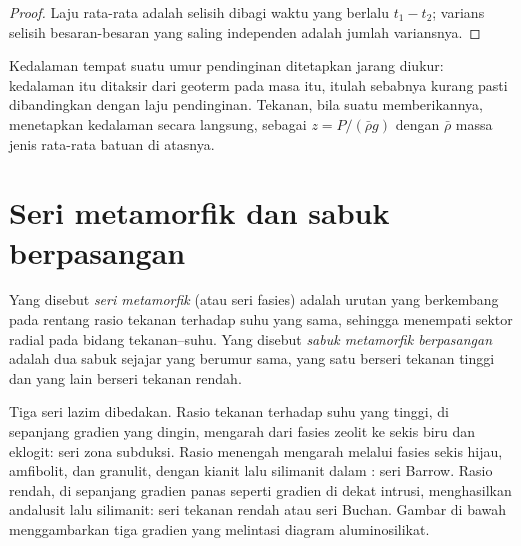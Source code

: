 \begin{proof}
Laju rata-rata adalah selisih dibagi waktu yang berlalu $t_1 - t_2$; varians
selisih besaran-besaran yang saling independen adalah jumlah variansnya.
\end{proof}

Kedalaman tempat suatu umur pendinginan ditetapkan jarang diukur: kedalaman itu ditaksir dari
geoterm pada masa itu, itulah sebabnya  kurang pasti dibandingkan dengan laju pendinginan.
Tekanan, bila suatu  memberikannya, menetapkan kedalaman secara langsung, sebagai
$z = P/(\bar\rho g)$ dengan $\bar\rho$ massa jenis rata-rata batuan di atasnya.

\section{Seri metamorfik dan sabuk berpasangan}\label{sec:b2:pt-paths:series}

\begin{definition}\label{def:b2:pt-paths:series}
Yang disebut \emph{seri metamorfik} (atau seri fasies) adalah urutan
 yang berkembang pada rentang rasio tekanan terhadap suhu yang sama,
sehingga menempati sektor radial pada bidang tekanan--suhu.
Yang disebut \emph{sabuk metamorfik berpasangan} adalah dua sabuk sejajar yang
berumur sama, yang satu berseri tekanan tinggi dan yang lain berseri tekanan rendah.
\end{definition}

Tiga seri lazim dibedakan. Rasio tekanan terhadap suhu yang tinggi, di sepanjang
gradien yang dingin, mengarah dari fasies zeolit ke sekis biru dan eklogit: seri
zona subduksi. Rasio menengah mengarah melalui fasies sekis hijau, amfibolit, dan
granulit, dengan kianit lalu silimanit dalam : seri Barrow. Rasio
rendah, di sepanjang gradien panas seperti gradien di dekat intrusi, menghasilkan andalusit lalu
silimanit: seri tekanan rendah atau seri Buchan. Gambar di bawah menggambarkan tiga gradien
yang melintasi diagram aluminosilikat.

